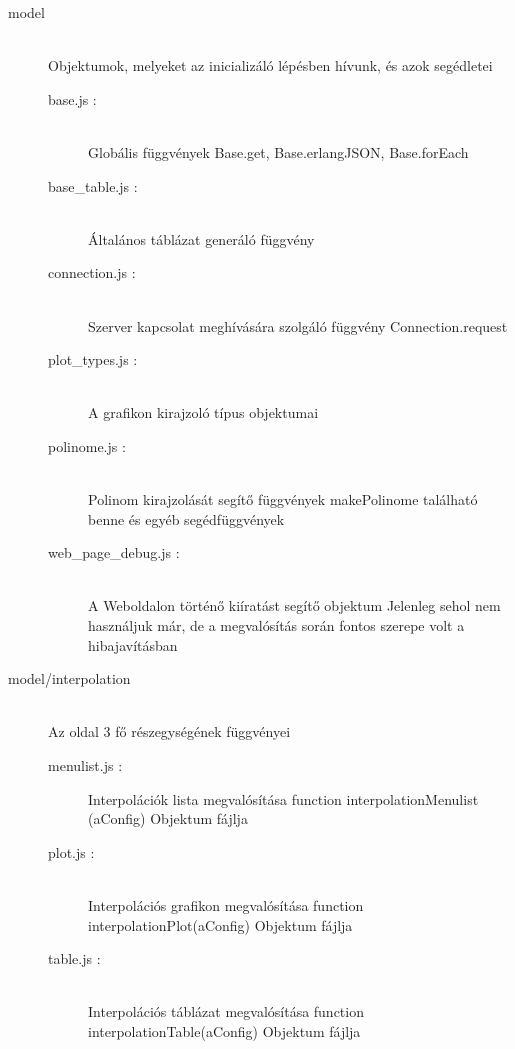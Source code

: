 \begin{description}
		\item[model] \hfill \\ 
		Objektumok, melyeket az inicializáló lépésben hívunk, és azok segédletei
		\begin{description}
		 	\item[base.js : ] \hfill \\
		 		Globális függvények \newline
		 		Base.get, Base.erlangJSON, Base.forEach
		 	\item[base\_table.js : ] \hfill \\
		 		Általános táblázat generáló függvény
		 	\item[connection.js : ] \hfill \\
		 		Szerver kapcsolat meghívására szolgáló függvény \newline
		 		Connection.request
		 	\item[plot\_types.js : ] \hfill \\
		 		A grafikon kirajzoló típus objektumai
		 	\item[polinome.js : ] \hfill \\  
		 		Polinom kirajzolását segítő függvények \newline
		 		makePolinome található benne és egyéb segédfüggvények
		 	\item[web\_page\_debug.js : ] \hfill \\ 
		 		A Weboldalon történő kiíratást segítő objektum \newline
		 		Jelenleg sehol nem használjuk már, de a megvalósítás során fontos szerepe volt a hibajavításban
		\end{description}
		\item[model/interpolation] \hfill \\
		Az oldal 3 fő részegységének függvényei
			\begin{description}
			\item[menulist.js : ] 
				Interpolációk lista megvalósítása \newline
				function interpolationMenulist (aConfig) Objektum fájlja
		  	\item[plot.js : ] \hfill \\ 
		  		Interpolációs grafikon megvalósítása \newline
				function interpolationPlot(aConfig) Objektum fájlja
			\item[table.js : ] \hfill \\
				Interpolációs táblázat megvalósítása \newline
				function interpolationTable(aConfig) Objektum fájlja
			\end{description}
	\end{description}
